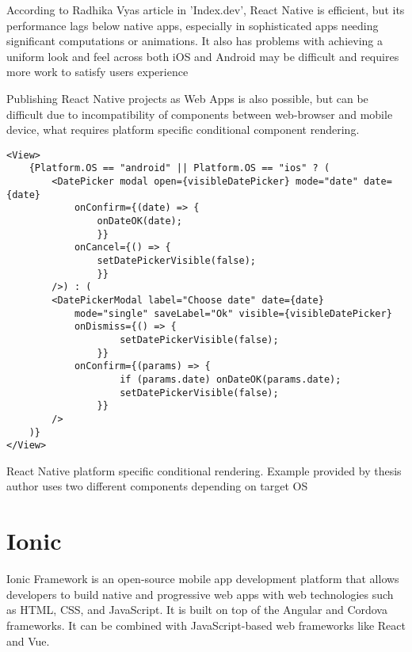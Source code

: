 According to Radhika Vyas article in 'Index.dev', React Native is efficient, but its performance lags below native apps, especially in sophisticated apps needing significant computations or animations. It also has problems with achieving a uniform look and feel across both iOS and Android may be difficult and requires more work to satisfy users experience \textcite{Vyas}

Publishing React Native projects as Web Apps is also possible, but can be difficult due to incompatibility of components between web-browser and mobile device, what requires platform specific conditional component rendering.




\begin{listing}[H]
\begin{verbatim}
<View>
    {Platform.OS == "android" || Platform.OS == "ios" ? (
        <DatePicker modal open={visibleDatePicker} mode="date" date={date}
            onConfirm={(date) => {
                onDateOK(date);
                }}
            onCancel={() => {
                setDatePickerVisible(false);
                }}
        />) : (
        <DatePickerModal label="Choose date" date={date}
            mode="single" saveLabel="Ok" visible={visibleDatePicker}
            onDismiss={() => {
                    setDatePickerVisible(false);
                }}
            onConfirm={(params) => {
                    if (params.date) onDateOK(params.date);
                    setDatePickerVisible(false);
                }}
        />
    )}
</View>
\end{verbatim}
\caption[React Native platform specific conditional rendering]{React Native platform specific conditional rendering. Example provided by thesis author uses two different components depending on target OS}
\end{listing}
                
                
                
                
\section{{Ionic}}%
\label{sec:ionic}

Ionic Framework is an open-source mobile app development platform that allows developers to build native and progressive web apps with web technologies such as HTML, CSS, and JavaScript. It is built on top of the Angular and Cordova frameworks. It can be combined with JavaScript-based web frameworks like React and Vue.

